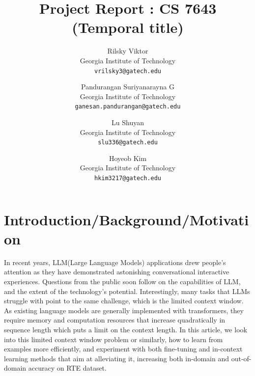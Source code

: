 \documentclass[10pt,twocolumn,letterpaper]{article}
\begin{document}
\title{Project Report : CS 7643 (Temporal title)}

\author{Rilsky Viktor\\
Georgia Institute of Technology\\
{\tt\small vrilsky3@gatech.edu}
\and
Pandurangan Suriyanarayna G\\
Georgia Institute of Technology\\
{\tt\small ganesan.pandurangan@gatech.edu}
\and
Lu Shuyan\\
Georgia Institute of Technology\\
{\tt\small slu336@gatech.edu}
\and
Hoyeob Kim\\
Georgia Institute of Technology\\
{\tt\small hkim3217@gatech.edu}
}

\maketitle


\section{Introduction/Background/Motivation}
In recent years, LLM(Large Language Models) applications drew people’s attention as they have demonstrated astonishing conversational interactive experiences. Questions from the public soon follow on the capabilities of LLM, and the extent of the technology’s potential. Interestingly, many tasks that LLMs struggle with point to the same challenge, which is the limited context window. As existing language models are generally implemented with transformers, they require memory and computation resources that increase quadratically in sequence length which puts a limit on the context length. In this article, we look into this limited context window problem or similarly, how to learn from examples more efficiently, and experiment with both fine-tuning and in-context learning methods that aim at alleviating it, increasing both in-domain and out-of-domain accuracy on RTE dataset.
\end{document}
